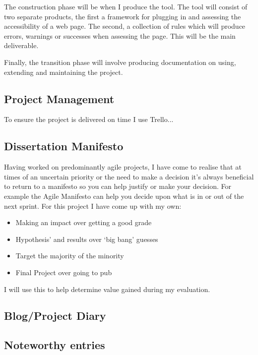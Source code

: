 The construction phase will be when I produce the tool. The tool will consist of two separate products, the first a framework for plugging
in and assessing the accessibility of a web page. The second, a collection of rules which will produce errors, warnings or successes when
assessing the page. This will be the main deliverable.

Finally, the transition phase will involve producing documentation on using, extending and maintaining the project.

\subsection{Project Management}
To ensure the project is delivered on time I use Trello...

\subsection{Dissertation Manifesto}
Having worked on predominantly agile projects, I have come to realise that at times of an uncertain priority or the need to make a decision
it’s always beneficial to return to a manifesto so you can help justify or make your decision. For example the Agile Manifesto can help you
decide upon what is in or out of the next sprint. For this project I have come up with my own:
\begin{itemize}
  \item Making an impact over getting a good grade
  \item Hypothesis’ and results over ‘big bang’ guesses
  \item Target the majority of the minority
  \item Final Project over going to pub
\end{itemize}
I will use this to help determine value gained during my evaluation.

\subsection{Blog/Project Diary}

\subsection{Noteworthy entries}

